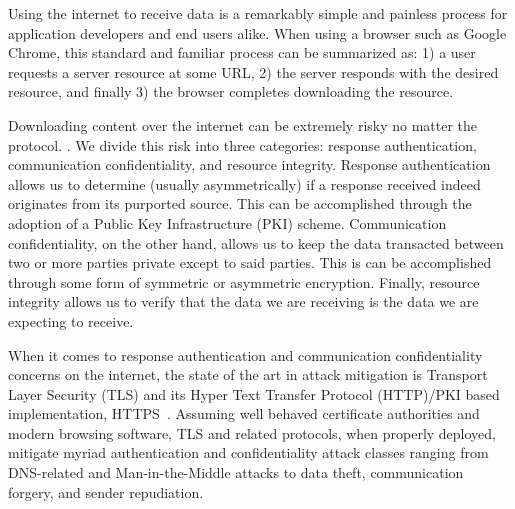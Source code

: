 Using the internet to receive data is a remarkably simple and painless process
for application developers and end users alike. When using a browser such as
Google Chrome, this standard and familiar process can be summarized as: 1) a
user requests a server resource at some URL, 2) the server responds with the
desired resource, and finally 3) the browser completes downloading the resource.

Downloading content over the internet can be extremely risky no matter the
protocol. . We divide this risk into
three categories: response authentication, communication confidentiality, and
resource integrity. Response authentication allows us to determine (usually
asymmetrically) if a response received indeed originates from its purported
source. This can be accomplished through the adoption of a Public Key
Infrastructure (PKI) scheme. Communication confidentiality, on the other hand,
allows us to keep the data transacted between two or more parties private except
to said parties. This is can be accomplished through some form of symmetric or
asymmetric encryption. Finally, resource integrity allows us to verify that the
data we are receiving is the data we are expecting to receive.

When it comes to response authentication and communication confidentiality
concerns on the internet, the state of the art in attack mitigation is Transport
Layer Security (TLS) and its Hyper Text Transfer Protocol (HTTP)/PKI based
implementation, HTTPS~\cite{TLS1.2, TLS1, TLS0, HTTPS}. Assuming well behaved
certificate authorities and modern browsing software, TLS and related protocols,
when properly deployed, mitigate myriad authentication and confidentiality
attack classes ranging from DNS-related and Man-in-the-Middle attacks to data
theft, communication forgery, and sender repudiation.

